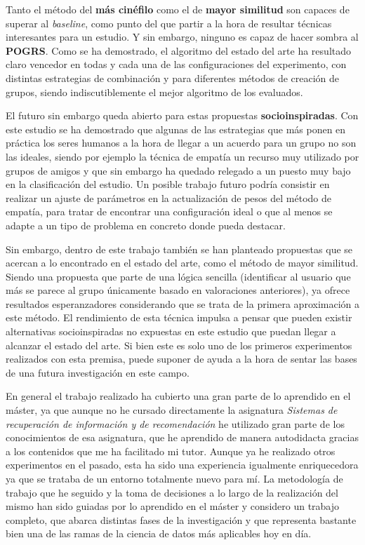 Tanto el método del \textbf{más cinéfilo} como el de \textbf{mayor similitud} son capaces de superar al \textit{baseline}, como punto del que partir a la hora de resultar técnicas interesantes para un estudio. Y sin embargo, ninguno es capaz de hacer sombra al \textbf{POGRS}. Como se ha demostrado, el algoritmo del estado del arte ha resultado claro vencedor en todas y cada una de las configuraciones del experimento, con distintas estrategias de combinación y para diferentes métodos de creación de grupos, siendo indiscutiblemente el mejor algoritmo de los evaluados.

El futuro sin embargo queda abierto para estas propuestas \textbf{socioinspiradas}. Con este estudio se ha demostrado que algunas de las estrategias que más ponen en práctica los seres humanos a la hora de llegar a un acuerdo para un grupo no son las ideales, siendo por ejemplo la técnica de empatía un recurso muy utilizado por grupos de amigos y que sin embargo ha quedado relegado a un puesto muy bajo en la clasificación del estudio. Un posible trabajo futuro podría consistir en realizar un ajuste de parámetros en la actualización de pesos del método de empatía, para tratar de encontrar una configuración ideal o que al menos se adapte a un tipo de problema en concreto donde pueda destacar.

Sin embargo, dentro de este trabajo también se han planteado propuestas que se acercan a lo encontrado en el estado del arte, como el método de mayor similitud. Siendo una propuesta que parte de una lógica sencilla (identificar al usuario que más se parece al grupo únicamente basado en valoraciones anteriores), ya ofrece resultados esperanzadores considerando que se trata de la primera aproximación a este método. El rendimiento de esta técnica impulsa a pensar que pueden existir alternativas socioinspiradas no expuestas en este estudio que puedan llegar a alcanzar el estado del arte. Si bien este es solo uno de los primeros experimentos realizados con esta premisa, puede suponer de ayuda a la hora de sentar las bases de una futura investigación en este campo.

En general el trabajo realizado ha cubierto una gran parte de lo aprendido en el máster, ya que aunque no he cursado directamente la asignatura \textit{Sistemas de recuperación de información y de recomendación} he utilizado gran parte de los conocimientos de esa asignatura, que he aprendido de manera autodidacta gracias a los contenidos que me ha facilitado mi tutor. Aunque ya he realizado otros experimentos en el pasado, esta ha sido una experiencia igualmente enriquecedora ya que se trataba de un entorno totalmente nuevo para mí. La metodología de trabajo que he seguido y la toma de decisiones a lo largo de la realización del mismo han sido guiadas por lo aprendido en el máster y considero un trabajo completo, que abarca distintas fases de la investigación y que representa bastante bien una de las ramas de la ciencia de datos más aplicables hoy en día.


